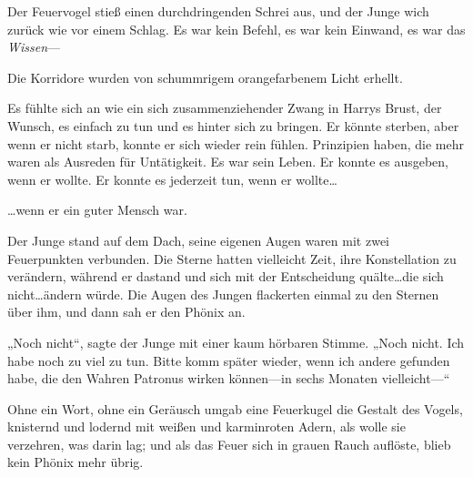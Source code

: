 Der Feuervogel stieß einen durchdringenden Schrei aus, und der Junge wich zurück wie vor einem Schlag. Es war kein Befehl, es war kein Einwand, es war das \emph{Wissen}—

Die Korridore wurden von schummrigem orangefarbenem Licht erhellt.

Es fühlte sich an wie ein sich zusammenziehender Zwang in Harrys Brust, der Wunsch, es einfach zu tun und es hinter sich zu bringen. Er könnte sterben, aber wenn er nicht starb, konnte er sich wieder rein fühlen. Prinzipien haben, die mehr waren als Ausreden für Untätigkeit. Es war sein Leben. Er konnte es ausgeben, wenn er wollte. Er konnte es jederzeit tun, wenn er wollte…

…wenn er ein guter Mensch war.

\later

Der Junge stand auf dem Dach, seine eigenen Augen waren mit zwei Feuerpunkten verbunden. Die Sterne hatten vielleicht Zeit, ihre Konstellation zu verändern, während er dastand und sich mit der Entscheidung quälte…die sich nicht…ändern würde.
Die Augen des Jungen flackerten einmal zu den Sternen über ihm, und dann sah er den Phönix an.

„Noch nicht“, sagte der Junge mit einer kaum hörbaren Stimme. „Noch nicht. Ich habe noch zu viel zu tun. Bitte komm später wieder, wenn ich andere gefunden habe, die den Wahren Patronus wirken können—in sechs Monaten vielleicht—“

Ohne ein Wort, ohne ein Geräusch umgab eine Feuerkugel die Gestalt des Vogels, knisternd und lodernd mit weißen und karminroten Adern, als wolle sie verzehren, was darin lag; und als das Feuer sich in grauen Rauch auflöste, blieb kein Phönix mehr übrig.

